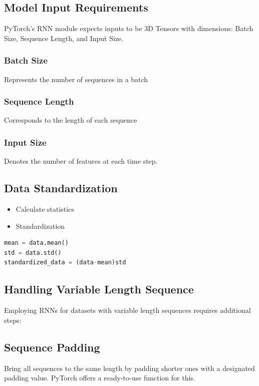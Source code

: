 \documentclass{article}
\begin{document}
\subsection{Model Input Requirements}
PyTorch's RNN module expects inputs to be 3D Tensors with dimensions: Batch Size, Sequence Length, and Input Size.
\subsubsection{Batch Size}
Represents the number of sequences in a batch
\subsubsection{Sequence Length}
Corresponds to the length of each sequence
\subsubsection{Input Size}
Denotes the number of features at each time step.
\subsection{Data Standardization}
\begin{itemize}
    \item Calculate statistics
    \item Standardization
    
\end{itemize}
\begin{lstlisting}[language=Python]
mean = data.mean()
std = data.std()
standardized_data = (data-mean)std
\end{lstlisting}
\subsection{Handling Variable Length Sequence}
Employing RNNs for datasets with variable length sequences requires additional steps:
\subsection{Sequence Padding}
Bring all sequences to the same length by padding shorter ones with a designated padding value. PyTorch offers a ready-to-use function for this.
\end{document}
